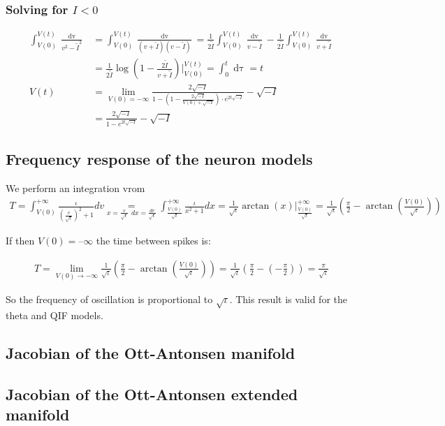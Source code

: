\subsubsection{Solving for \texorpdfstring{$I < 0$}{TEXT}}
\begin{align*}
\int_{V(0)}^{V(t)} \frac{\mathop{dv}}{v^2 - \tilde{I}^2} &= \int_{V(0)}^{V(t)} \frac{\mathop{dv}}{(v+\tilde{I})(v-\tilde{I})} 
= \frac{1}{2 \tilde{I}} \int_{V(0)}^{V(t)} \frac{\mathop{dv}}{v-\tilde{I}}-\frac{1}{2 \tilde{I}} \int_{V(0)}^{V(t)} \frac{\mathop{dv}}{v+\tilde{I}} \\
&= \frac{1}{2 \tilde{I}} \log \left(1-\frac{2 \tilde{I}}{v+\tilde{I}}\right) \Big \rvert_{V(0)}^{V(t)} 
= \int_0^t \mathop{d\tau} = t \\
V(t) &= \lim_{V(0) = -\infty} \frac{2 \sqrt{-I}}{1 - \left(1-\frac{2 \sqrt{-I}}{V(0)+\sqrt{-I}}\right)\cdot e^{2 t \sqrt{-I}}}-\sqrt{-I}\\
&= \frac{2 \sqrt{-I}}{1 - e^{2 t \sqrt{-I}}}-\sqrt{-I}
\end{align*}


\subsection{Frequency response of the neuron models} \label{app:ThetaModelFrequencyResponse}
We perform an integration vrom
\begin{align*}
T = \int_{V(0)}^{+\infty} \frac{\iota}{\left(\frac{v}{\sqrt{\iota}}\right)^2 + 1} dv 
\underset{x = \frac{v}{\sqrt{\iota}} \: \:dx = \frac{dv}{\sqrt{\iota}}}{=} 
\int_{\frac{V(0)}{\sqrt{\iota}}}^{+\infty} \frac{\iota}{x^2 + 1} dx 
= \frac{1}{\sqrt{\iota}} \arctan(x) \rvert_{\frac{V(0)}{\sqrt{\iota}}}^{+\infty} 
= \frac{1}{\sqrt{\iota}} \left( \frac{\pi}{2} - \arctan \left( \frac{V(0)}{\sqrt{\iota}} \right) \right)
\end{align*}

If then $V(0) = –\infty$ the time between spikes is:

\begin{align*}
T = \lim_{V(0) \rightarrow -\infty} \frac{1}{\sqrt{\iota}} \left( \frac{\pi}{2} - \arctan \left( \frac{V(0)}{\sqrt{\iota}} \right) \right) = \frac{1}{\sqrt{\iota}} \left( \frac{\pi}{2} - \left( - \frac{\pi}{2} \right) \right)
= \frac{\pi}{\sqrt{\iota}}
\end{align*}

So the frequency of oscillation is proportional to $\sqrt{\iota}$. This result is valid for the theta and QIF models.


\subsection{Jacobian of the Ott-Antonsen manifold}
\subsection{Jacobian of the Ott-Antonsen extended manifold}







